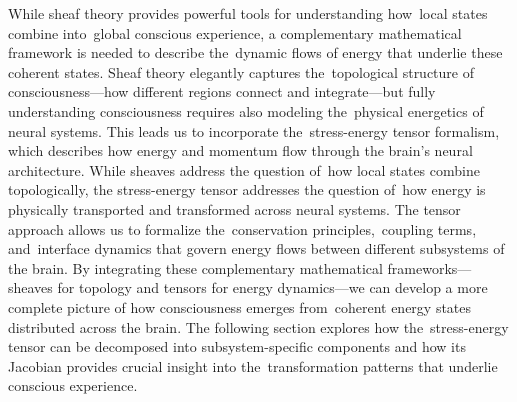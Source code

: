 While sheaf theory provides powerful tools for understanding how~local states combine into~global conscious experience, a complementary mathematical framework is needed to describe the~dynamic flows of energy that underlie these coherent states. Sheaf theory elegantly captures the~topological structure of consciousness—how different regions connect and integrate—but fully understanding consciousness requires also modeling the~physical energetics of neural systems. This leads us to incorporate the~stress-energy tensor formalism, which describes how energy and momentum flow through the brain's neural architecture. While sheaves address the question of~how local states combine topologically, the stress-energy tensor addresses the question of~how energy is physically transported and transformed across neural systems. The tensor approach allows us to formalize the~conservation principles,~coupling terms, and~interface dynamics that govern energy flows between different subsystems of the brain. By integrating these complementary mathematical frameworks—sheaves for topology and tensors for energy dynamics—we can develop a more complete picture of how consciousness emerges from~coherent energy states distributed across the brain. The following section explores how the~stress-energy tensor can be decomposed into subsystem-specific components and how its Jacobian provides crucial insight into the~transformation patterns that underlie conscious experience.
